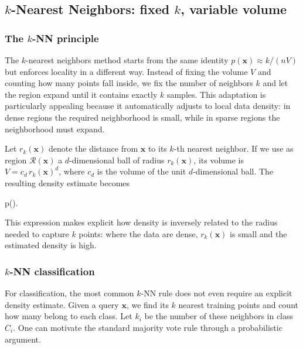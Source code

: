 \medskip

\subsection*{\(k\)-Nearest Neighbors: fixed \(k\), variable volume}

\subsubsection*{The \(k\)-NN principle}

The \(k\)-nearest neighbors method starts from the same identity \(p(\mathbf{x})\approx k/(nV)\) but enforces locality in a different way. Instead of fixing the volume \(V\) and counting how many points fall inside, we fix the number of neighbors \(k\) and let the region expand until it contains exactly \(k\) samples. This adaptation is particularly appealing because it automatically adjusts to local data density: in dense regions the required neighborhood is small, while in sparse regions the neighborhood must expand.

Let \(r_k(\mathbf{x})\) denote the distance from \(\mathbf{x}\) to its \(k\)-th nearest neighbor. If we use as region \(\mathcal{R}(\mathbf{x})\) a \(d\)-dimensional ball of radius \(r_k(\mathbf{x})\), its volume is \(V=c_d\,r_k(\mathbf{x})^d\), where \(c_d\) is the volume of the unit \(d\)-dimensional ball. The resulting density estimate becomes
\begin{myequation}
p()\approx {}.
\end{myequation}
This expression makes explicit how density is inversely related to the radius needed to capture \(k\) points: where the data are dense, \(r_k(\mathbf{x})\) is small and the estimated density is high.

\medskip

\subsubsection*{\(k\)-NN classification}

For classification, the most common \(k\)-NN rule does not even require an explicit density estimate. Given a query \(\mathbf{x}\), we find its \(k\) nearest training points and count how many belong to each class. Let \(k_i\) be the number of these neighbors in class \(C_i\). One can motivate the standard majority vote rule through a probabilistic argument.

